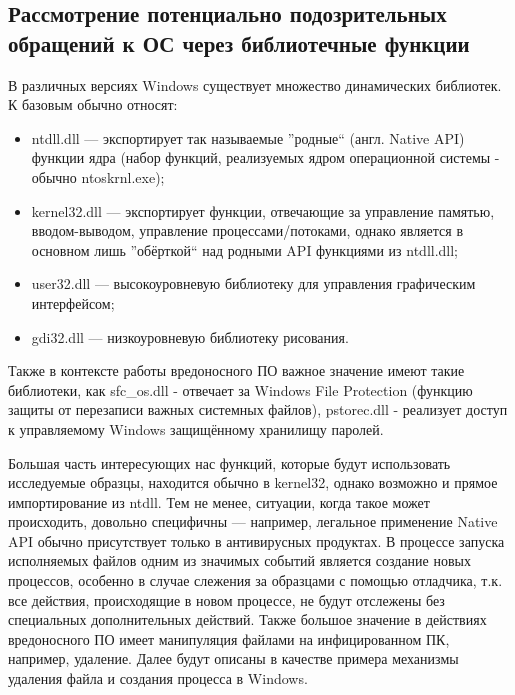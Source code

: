 \subsection {Рассмотрение потенциально подозрительных обращений к ОС через библиотечные функции}
В различных версиях Windows существует множество динамических библиотек. К базовым обычно относят:
\begin {itemize}
	\item ntdll.dll --- экспортирует так называемые ''родные`` (англ. Native API) функции ядра (набор функций, реализуемых ядром операционной системы - обычно ntoskrnl.exe);
	\item kernel32.dll --- экспортирует функции, отвечающие за управление памятью, вводом-выводом, управление процессами/потоками, однако является в основном лишь ''обёрткой`` над родными API функциями из ntdll.dll;
	\item user32.dll --- высокоуровневую библиотеку для управления графическим интерфейсом;
	\item gdi32.dll --- низкоуровневую библиотеку рисования.
\end {itemize}
Также в контексте работы вредоносного ПО важное значение имеют такие библиотеки, как sfc\_os.dll - отвечает за Windows File Protection (функцию защиты от перезаписи важных системных файлов), pstorec.dll - реализует доступ к управляемому Windows защищённому хранилищу паролей.

Большая часть интересующих нас функций, которые будут использовать исследуемые образцы, находится  обычно в kernel32, однако возможно и прямое импортирование  из ntdll. Тем не менее, ситуации, когда такое может происходить, довольно специфичны --- например, легальное применение Native API обычно присутствует только в антивирусных продуктах.
В процессе запуска исполняемых файлов одним из значимых событий является создание новых процессов, особенно в случае слежения за образцами с помощью отладчика, т.к. все действия, происходящие в новом процессе, не будут отслежены без специальных дополнительных действий. Также большое значение в действиях вредоносного ПО имеет манипуляция файлами на инфицированном ПК, например, удаление. Далее будут описаны в качестве примера механизмы удаления файла и создания процесса в Windows.

